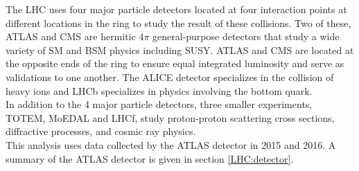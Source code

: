 \indent The LHC uses four major particle detectors located at four interaction points at different locations in the ring to study the result of these collisions.  Two of these, ATLAS and CMS are hermitic $4\pi$ general-purpose detectors that study a wide variety of SM and BSM physics including SUSY.   ATLAS and CMS are located at the opposite ends of the ring to ensure equal integrated luminosity and serve as validations to one another.  The ALICE detector specializes in the collision of heavy ions and LHCb specializes in physics involving the bottom quark. \\

\indent In addition to the 4 major particle detectors, three smaller experiments, TOTEM, MoEDAL and LHCf, study proton-proton scattering cross sections, diffractive processes, and cosmic ray physics.  ~\\

\indent This analysis uses data collected by the ATLAS detector in 2015 and 2016.  A summary of the ATLAS detector is given in section \ref{LHC:detector}. \\




